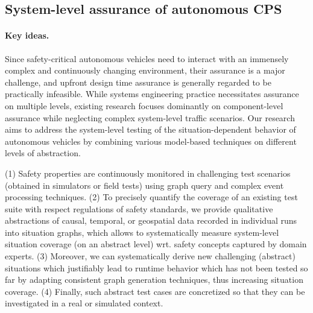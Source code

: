\subsection{System-level assurance of autonomous CPS}

\paragraph{Key ideas.}
Since safety-critical autonomous vehicles need to interact with an immensely complex and continuously changing environment, their assurance is a major challenge, and upfront design time assurance is generally regarded to be practically infeasible. While systems engineering practice necessitates assurance on multiple levels,  existing research focuses dominantly on component-level assurance while neglecting complex system-level traffic scenarios.
Our research aims to address the system-level testing of the situation-dependent behavior of autonomous vehicles by combining various model-based techniques on different levels of abstraction. 

(1) Safety properties are continuously monitored in challenging test scenarios (obtained in simulators or field tests) using graph query and complex event processing techniques.  (2) To precisely quantify the coverage of an existing test suite with respect regulations of safety standards, we provide qualitative abstractions of causal, temporal, or geospatial data recorded in individual runs into situation graphs, which allows to systematically measure system-level situation coverage (on an abstract level) wrt. safety concepts captured by domain experts.  (3) Moreover, we can systematically derive new challenging (abstract) situations which justifiably lead to runtime behavior which has not been tested so far by adapting consistent graph generation techniques, thus increasing situation coverage. (4) Finally, such abstract test cases are concretized so that they can be investigated in a real or simulated context.


